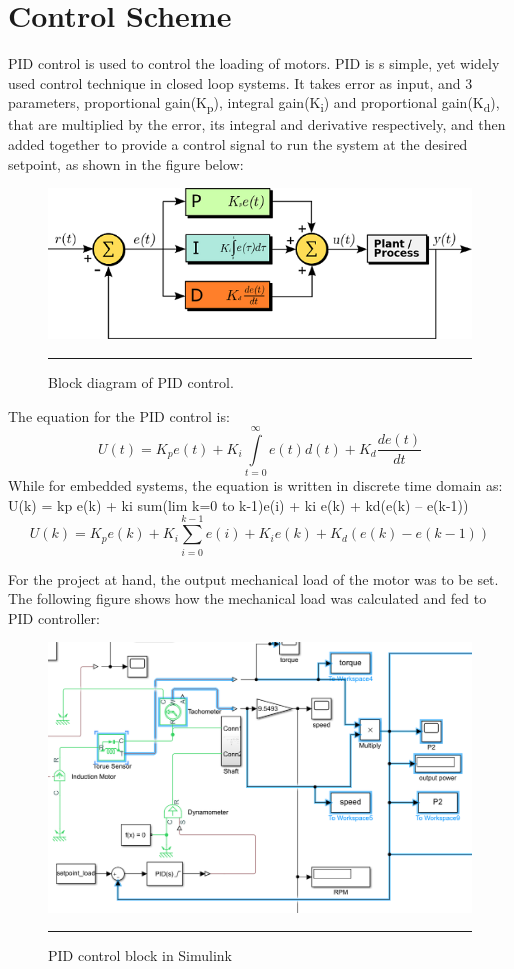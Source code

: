 \section{Control Scheme}
PID control is used to control the loading of motors. PID is s simple, yet widely used control technique in closed loop systems. It takes error as input, and 3 parameters, proportional gain(K\textsubscript{p}), integral gain(K\textsubscript{i}) and proportional gain(K\textsubscript{d}), that are multiplied by the error, its integral and derivative respectively, and then added together to provide a control signal to run the system at the desired setpoint, as shown in the figure below:
\begin{figure}[htbp]
	\centering
		\includegraphics[width = 4.5in]{./Figures/MS/fig317.png}
		\rule{35em}{0.5pt}
	\caption{Block diagram of PID control.}
	\label{fig:Block diagram of PID control.}
\end{figure}
The equation for the PID control is:
\begin{equation}
	U(t) = K_p e(t) + K_i \int\limits_{t=0}^{\infty} e(t) d(t) + K_d \frac{de(t)}{dt}
\end{equation}
While for embedded systems, the equation is written in discrete time domain as:
U(k) = kp e(k) + ki sum(lim k=0 to k-1)e(i) + ki e(k) + kd(e(k) – e(k-1))
\begin{equation}
	U(k)=K_p e(k) + K_i \sum\limits_{i=0}^{k-1}e(i) + K_i e(k) + K_d(e(k) - e(k-1))
\end{equation}

For the project at hand, the output mechanical load of the motor was to be set. The following figure shows how the mechanical load was calculated and fed to PID controller:
\begin{figure}[htbp]
	\centering
		\includegraphics[width = 4.5in]{./Figures/MS/fig318.png}
		\rule{35em}{0.5pt}
	\caption{PID control block in Simulink}
	\label{fig:PID control block in Simulink}
\end{figure}

